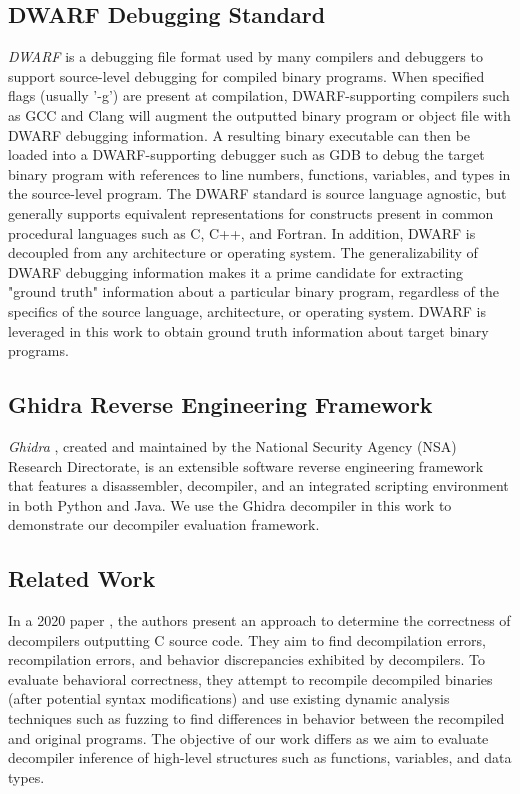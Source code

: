 \documentclass[a4paper,twoside]{article}
\begin{document}
\subsection{DWARF Debugging Standard}

\emph{DWARF} \cite{bib:dwarf} is a debugging file format used by many compilers and debuggers to support source-level debugging for compiled binary programs. When specified flags (usually '-g') are present at compilation, DWARF-supporting compilers such as GCC and Clang will augment the outputted binary program or object file with DWARF debugging information. A resulting binary executable can then be loaded into a DWARF-supporting debugger such as GDB to debug the target binary program with references to line numbers, functions, variables, and types in the source-level program. The DWARF standard is source language agnostic, but generally supports equivalent representations for constructs present in common procedural languages such as C, C++, and Fortran. In addition, DWARF is decoupled from any architecture or operating system. The generalizability of DWARF debugging information makes it a prime candidate for extracting "ground truth" information about a particular binary program, regardless of the specifics of the source language, architecture, or operating system. DWARF is leveraged in this work to obtain ground truth information about target binary programs.

\subsection{Ghidra Reverse Engineering Framework}

\emph{Ghidra} \cite{bib:ghidra}, created and maintained by the National Security Agency (NSA) Research Directorate, is an extensible software reverse engineering framework that features a disassembler, decompiler, and an integrated scripting environment in both Python and Java. We use the Ghidra decompiler in this work to demonstrate our decompiler evaluation framework.

\subsection{Related Work}

In a 2020 paper \cite{bib:how-far-weve-come}, the authors present an approach to determine the correctness of decompilers outputting C source code. They aim to find decompilation errors, recompilation errors, and behavior discrepancies exhibited by decompilers. To evaluate behavioral correctness, they attempt to recompile decompiled binaries (after potential syntax modifications) and use existing dynamic analysis techniques such as fuzzing to find differences in behavior between the recompiled and original programs. The objective of our work differs as we aim to evaluate decompiler inference of high-level structures such as functions, variables, and data types.
\end{document}
